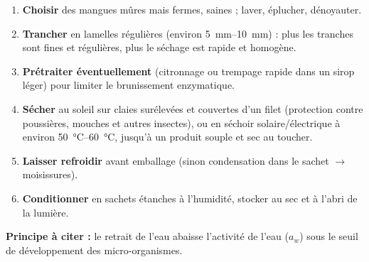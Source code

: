 \documentclass[11pt]{article}
\begin{document}
\begin{methode}
\begin{enumerate}
\item \textbf{Choisir} des mangues mûres mais fermes, saines ; laver, éplucher, dénoyauter.
\item \textbf{Trancher} en lamelles régulières (environ \SIrange{5}{10}{mm}) : plus les tranches sont fines et régulières, plus le séchage est rapide et homogène.
\item \textbf{Prétraiter éventuellement} (citronnage ou trempage rapide dans un sirop léger) pour limiter le brunissement enzymatique.
\item \textbf{Sécher} au soleil sur claies surélevées et couvertes d'un filet (protection contre poussières, mouches et autres insectes), ou en séchoir solaire/électrique à environ \SIrange{50}{60}{\celsius}, jusqu'à un produit souple et sec au toucher.
\item \textbf{Laisser refroidir} avant emballage (sinon condensation dans le sachet $\rightarrow$ moisissures).
\item \textbf{Conditionner} en sachets étanches à l'humidité, stocker au sec et à l'abri de la lumière.
\end{enumerate}
\textbf{Principe à citer :} le retrait de l'eau abaisse l'activité de l'eau ($a_w$) sous le seuil de développement des micro-organismes.
\end{methode}
\end{document}
